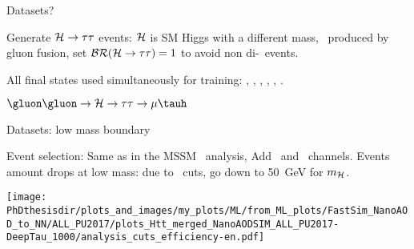 \begin{frame}{Datasets?}

\begin{minipage}[c]{.49\textwidth}
\manip Generate $\mathcal{H}\to\tau\tau$ events:
\submanip $\mathcal{H}$ is SM Higgs with a different mass,
\submanip \higgsML\ produced by gluon fusion,
\submanip set $\mathcal{BR}(\mathcal{H}\to\tau\tau)=1$ to avoid non di-\tau\ events.

\manip All final states used simultaneously for training:
\submanip \tauh\tauh, \mu\tauh, \ele\tauh, \mu\mu, \ele\mu, \ele\ele.
\end{minipage}
\hfill
\begin{minipage}[c]{.48\textwidth}
\def\Higgs{\higgsML}
\begin{block}{$\gluon\gluon\to\Higgs\to\tau\tau\to\mu\tauh$}
\begin{center}

\vspace{2\baselineskip}



\vspace{2\baselineskip}

\end{center}
\end{block}
\end{minipage}
\end{frame}

\begin{frame}{Datasets: low mass boundary}

\begin{minipage}[c]{.45\textwidth}
\manip Event selection:
\submanip Same as in the MSSM \HAtoTauTau\ analysis,
\submanip Add \mu\mu\ and \ele\ele\ channels.
\manip Events amount drops at low mass:
\submanip due to \pT\ cuts,
\submanip go down to \SI{50}{\GeV} for $m_{\mathcal{H}}$.
\end{minipage}
\hfill
\begin{minipage}[c]{.45\textwidth}
\begin{center}
\texttt{[image: \\PhDthesisdir/plots\_and\_images/my\_plots/ML/from\_ML\_plots/FastSim\_NanoAOD\_to\_NN/ALL\_PU2017/plots\_Htt\_merged\_NanoAODSIM\_ALL\_PU2017-DeepTau\_1000/analysis\_cuts\_efficiency-en.pdf]}
\end{center}
\end{minipage}

\end{frame}

